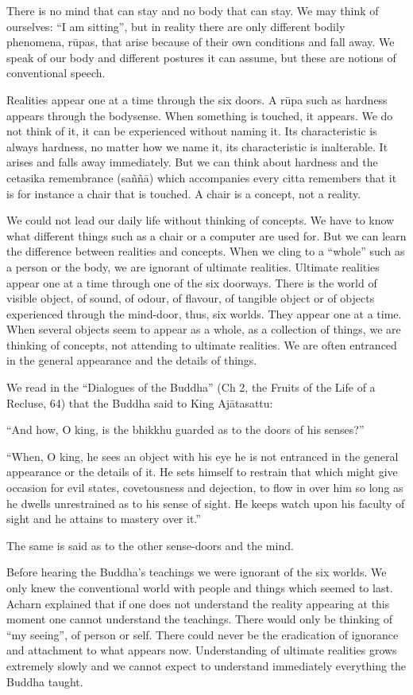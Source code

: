 There is no mind that can stay and no
body that can stay. We may think of ourselves: ``I am sitting'', but in
reality there are only different bodily phenomena, rūpas, that arise
because of their own conditions and fall away. We speak of our body and
different postures it can assume, but these are notions of conventional
speech.

Realities appear one at a time through
the six doors. A rūpa such as hardness appears through the bodysense.
When something is touched, it appears. We do not think of it, it can be
experienced without naming it. Its characteristic is always hardness, no
matter how we name it, its characteristic is inalterable. It arises and
falls away immediately. But we can think about hardness and the cetasika
remembrance (saññā) which accompanies every citta remembers that it is
for instance a chair that is touched. A chair is a concept, not a
reality. 

We could not lead our daily life
without thinking of concepts. We have to know what different things such
as a chair or a computer are used for. But we can learn the difference
between realities and concepts. When we cling to a ``whole'' such as a
person or the body, we are ignorant of ultimate realities. Ultimate
realities appear one at a time through one of the six doorways. There is
the world of visible object, of sound, of odour, of flavour, of tangible
object or of objects experienced through the mind-door, thus, six
worlds. They appear one at a time. When several objects seem to appear
as a whole, as a collection of things, we are thinking of concepts, not
attending to ultimate realities. We are often entranced in the general
appearance and the details of things.

We read in the ``Dialogues of the
Buddha'' (Ch 2, the Fruits of the Life of a Recluse, 64) that the Buddha
said to King Ajātasattu:

``And how, O king, is the bhikkhu guarded as to the doors of his
senses?''

``When, O king, he sees an object with
his eye he is not entranced in the general appearance or the details of
it. He sets himself to restrain that which might give occasion for evil
states, covetousness and dejection, to flow in over him so long as he
dwells unrestrained as to his sense of sight. He keeps watch upon his
faculty of sight and he attains to mastery over it.''

The same is said as to the other sense-doors and the mind.

Before hearing the Buddha's teachings
we were ignorant of the six worlds. We only knew the conventional world
with people and things which seemed to last. Acharn explained that if
one does not understand the reality appearing at this moment one cannot
understand the teachings. There would only be thinking of ``my seeing'',
of person or self. There could never be the eradication of ignorance and
attachment to what appears now. Understanding of ultimate realities
grows extremely slowly and we cannot expect to understand immediately
everything the Buddha taught. 

